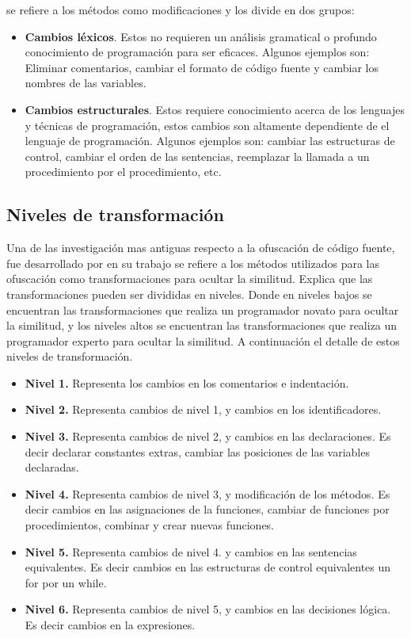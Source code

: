 \cite{Bejarano2015} se refiere a los métodos como modificaciones y los divide en dos grupos:
\begin{itemize}
  \item \textbf{Cambios léxicos}. Estos no requieren un análisis gramatical o profundo conocimiento de programación para ser eficaces. Algunos ejemplos son: Eliminar comentarios, cambiar el formato de código fuente y cambiar los nombres de las variables.
  \item \textbf{Cambios estructurales}. Estos requiere conocimiento acerca de los lenguajes y técnicas de programación, estos cambios son altamente dependiente de el lenguaje de programación. Algunos ejemplos son: cambiar las estructuras de control, cambiar el orden de las sentencias, reemplazar la llamada a un procedimiento por el procedimiento, etc.
\end{itemize}

\subsection{Niveles de transformación}
Una de las investigación mas antiguas respecto a la ofuscación de código fuente, fue desarrollado por \cite{Faidhi1987} en su trabajo se refiere a los métodos utilizados para las ofuscación como transformaciones para ocultar la similitud. Explica que las transformaciones pueden ser divididas en niveles. Donde en niveles bajos se encuentran las transformaciones que realiza un programador novato para ocultar la similitud, y los niveles altos se encuentran las transformaciones que realiza un programador experto para ocultar la similitud. A continuación el detalle de estos niveles de transformación.
\begin{itemize}
  \item \textbf{Nivel 1.} Representa los cambios en los comentarios e indentación.
  \item \textbf{Nivel 2.} Representa cambios de nivel 1, y cambios en los identificadores.
  \item \textbf{Nivel 3.} Representa cambios de nivel 2, y cambios en las declaraciones. Es decir declarar constantes extras, cambiar las posiciones de las variables declaradas.
  \item \textbf{Nivel 4.} Representa cambios de nivel 3, y modificación de los métodos. Es decir cambios en las asignaciones de la funciones, cambiar de funciones por procedimientos, combinar y crear nuevas funciones.
  \item \textbf{Nivel 5.} Representa cambios de nivel 4. y cambios en las sentencias equivalentes. Es decir cambios en las estructuras de control equivalentes un for por un while.
  \item \textbf{Nivel 6.} Representa cambios de nivel 5, y cambios en las decisiones lógica. Es decir cambios en la expresiones.
\end{itemize}

